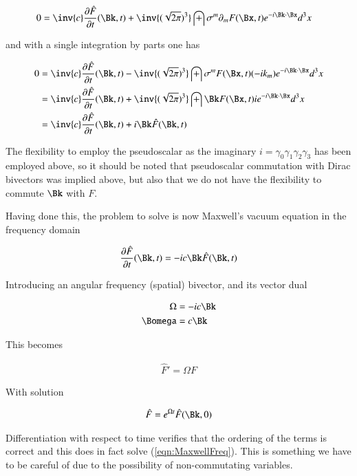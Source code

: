 \begin{align*}
0 &= \inv{c} \PD{t}{\hat{F}}(\Bk,t) + \inv{(\sqrt{2\pi})^3} \int \sigma^m \partial_m F(\Bx,t) e^{-i \Bk \cdot \Bx} d^3 x
\end{align*}

and with a single integration by parts one has

\begin{align*}
0
&= \inv{c} \PD{t}{\hat{F}}(\Bk,t) - \inv{(\sqrt{2\pi})^3} \int \sigma^m F(\Bx,t) (-i k_m) e^{-i \Bk \cdot \Bx} d^3 x \\
&= \inv{c} \PD{t}{\hat{F}}(\Bk,t) + \inv{(\sqrt{2\pi})^3} \int \Bk F(\Bx,t) i e^{-i \Bk \cdot \Bx} d^3 x \\
&= \inv{c} \PD{t}{\hat{F}}(\Bk,t) + i \Bk \hat{F}(\Bk,t)
\end{align*}

The flexibility to employ the pseudoscalar as the imaginary $i = \gamma_0 \gamma_1 \gamma_2 \gamma_3$ has been employed above, so it should be noted that pseudoscalar commutation with Dirac bivectors was implied above, but also that we do not have the flexibility to commute $\Bk$ with $F$.

Having done this, the problem to solve is now Maxwell's vacuum equation in the frequency domain

\begin{align*}
\PD{t}{\hat{F}}(\Bk,t) = -i c \Bk \hat{F}(\Bk,t)
\end{align*}

Introducing an angular frequency (spatial) bivector, and its vector dual

\begin{align}
\Omega &= -i c \Bk \\
\Bomega &= c \Bk
\end{align}

This becomes

\begin{align}\label{eqn:MaxwellFreq}
\hat{F}' = \Omega F
\end{align}

With solution

\begin{align}
\hat{F} = e^{\Omega t} \hat{F}(\Bk,0)
\end{align}

Differentiation with respect to time verifies that the ordering of the terms is correct and this does in fact solve (\ref{eqn:MaxwellFreq}).  This is something we have to be careful of due to the possibility of non-commutating variables.

